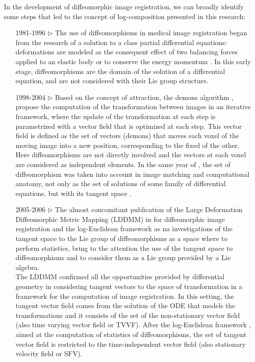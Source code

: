 In the development of diffeomorphic image registration, we can broadly identify some steps that led to the concept of log-composition presented in this research:
\begin{enumerate}
	\item[1981-1996 $\triangleright$] The use of diffeomorphisms in medical image registration began from the research of a solution to a class partial differential equations: deformations are modeled as the consequent effect of two balancing forces applied to an elastic body \cite{Broit:1981} or to conserve the energy momentum \cite{christensen1996deformable}. In this early stage, diffeomorphisms are the domain of the solution of a differential equation, and are not considered with their Lie group structure.
	\item[1998-2004 $\triangleright$] Based on the concept of attraction, the demons algorithm \cite{thirion1998image}, \cite{pennec1999understanding} propose the computation of the transformation between images in an iterative framework, where the update of the transformation at each step is parametrized with a vector field that is optimized at each step. This vector field is defined as the set of vectors (demons) that moves each voxel of the moving image into a new position, corresponding to the fixed of the other. \\
	Here diffeomorphisms are not directly involved and the vectors at each voxel are considered as independent elements. 
	In the same year of \cite{thirion1998image}, the set of diffeomorphism was taken into account in image matching and computational anatomy, not only as the set of solutions of some family of differential equations, but with its tangent space \cite{Dupuis:98:variationalproblems,  trouve1998diffeomorphisms, grenander1998computational}.
	\item[2005-2006 $\triangleright$] The almost concomitant publication of the Large Deformation Diffeomorphic Metric Mapping (LDDMM) in \cite{beg2005computing} for diffeomorphic image registration and  the log-Euclidean framework \cite{arsigny2006statistics, Arsigny:MRM:06}  as na investigations of the tangent space to the Lie group of diffeomorphisms as a space where to perform statistics,
	bring to the attention the use of the tangent space to diffeomorphisms and to consider them as a Lie group provided by a Lie algebra.\\
	The LDDMM confirmed all the opportunities provided by differential geometry in considering tangent vectors to the space of transformation in a framework for the computation of image registration. In this setting, the tangent vector field comes from the solution of the ODE that models the transformations and it consists of the set of the non-stationary vector field (also time varying vector field or TVVF). After the log-Euclidean framework \cite{arsigny2006statistics}, aimed at the computation of statistics of diffeomorphisms, the set of tangent vector field is restricted to the time-independent vector field (also stationary velocity field or SFV).

\end{enumerate}
